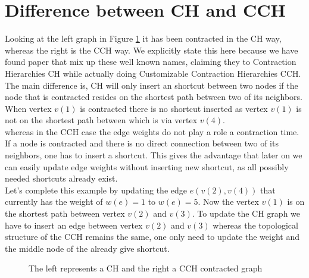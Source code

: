 \section{Difference between CH and CCH}

Looking at the left graph in Figure \ref*{fig:DifferenceCHAndCCH} it has been contracted in the CH way, whereas the right is the CCH way. We explicitly state this here because 
we have found paper \cite{Ouyang_2020} that mix up these well known names, claiming they to Contraction Hierarchies CH while actually doing Customizable Contraction Hierarchies CCH. 
The main difference is, CH will only insert an shortcut between two nodes if the node that is contracted resides on the shortest path between two of its neighbors. 
When vertex $v(1)$ is contracted there is no shortcut inserted as vertex $v(1)$ is not on the shortest path between which is via vertex $v(4)$.
\\
whereas in the CCH case the edge weights do not play a role a contraction time. If a node is contracted and there is no direct connection between two of its neighbors, one has to insert a shortcut. This gives
the advantage that later on we can easily update edge weights without inserting new shortcut, as all possibly needed shortcuts already exist.
\\ 
Let's complete this example by updating the edge $e(v(2), v(4))$ that currently has the weight of $w(e)=1$ to $w(e) = 5$. Now the vertex $v(1)$ is on the shortest path between vertex $v(2)$ and $v(3)$. 
To update the CH graph we have to insert an edge between vertex $v(2)$ and $v(3)$ whereas the topological structure of the CCH remains the same, one only need to update the weight and the middle node of the already give shortcut.

\begin{figure}
    \centering
    
    \caption{The left represents a CH and the right a CCH contracted graph}
    \label{fig:DifferenceCHAndCCH}
\end{figure}

